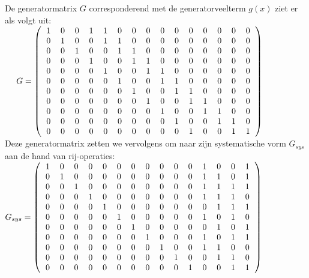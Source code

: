 \documentclass[11pt,a4paper]{article}
\begin{document}
De generatormatrix $G$ corresponderend met de generatorveelterm $g(x)$ ziet er als volgt uit:\\

$~~~~G=\left(
\begin{tabular}{ccccccccccccccc}
1 & 0 & 0 & 1 & 1 & 0 & 0 & 0 & 0 & 0 & 0 & 0 & 0 & 0 & 0\\
0 & 1 & 0 & 0 & 1 & 1 & 0 & 0 & 0 & 0 & 0 & 0 & 0 & 0 & 0\\
0 & 0 & 1 & 0 & 0 & 1 & 1 & 0 & 0 & 0 & 0 & 0 & 0 & 0 & 0\\
0 & 0 & 0 & 1 & 0 & 0 & 1 & 1 & 0 & 0 & 0 & 0 & 0 & 0 & 0\\
0 & 0 & 0 & 0 & 1 & 0 & 0 & 1 & 1 & 0 & 0 & 0 & 0 & 0 & 0\\
0 & 0 & 0 & 0 & 0 & 1 & 0 & 0 & 1 & 1 & 0 & 0 & 0 & 0 & 0\\
0 & 0 & 0 & 0 & 0 & 0 & 1 & 0 & 0 & 1 & 1 & 0 & 0 & 0 & 0\\	
0 & 0 & 0 & 0 & 0 & 0 & 0 & 1 & 0 & 0 & 1 & 1 & 0 & 0 & 0\\ 
0 & 0 & 0 & 0 & 0 & 0 & 0 & 0 & 1 & 0 & 0 & 1 & 1 & 0 & 0\\ 
0 & 0 & 0 & 0 & 0 & 0 & 0 & 0 & 0 & 1 & 0 & 0 & 1 & 1 & 0\\
0 & 0 & 0 & 0 & 0 & 0 & 0 & 0 & 0 & 0 & 1 & 0 & 0 & 1 & 1 
\end{tabular}
\right)$\\

Deze generatormatrix zetten we vervolgens om naar zijn systematische vorm $G_{sys}$ aan de hand van rij-operaties:\\

$G_{sys} =\left(
\begin{tabular}{ccccccccccccccc}
1 & 0 & 0 & 0 & 0 & 0 & 0 & 0 & 0 & 0 & 0 & 1 & 0 & 0 & 1\\
0 & 1 & 0 & 0 & 0 & 0 & 0 & 0 & 0 & 0 & 0 & 1 & 1 & 0 & 1\\
0 & 0 & 1 & 0 & 0 & 0 & 0 & 0 & 0 & 0 & 0 & 1 & 1 & 1 & 1\\
0 & 0 & 0 & 1 & 0 & 0 & 0 & 0 & 0 & 0 & 0 & 1 & 1 & 1 & 0\\
0 & 0 & 0 & 0 & 1 & 0 & 0 & 0 & 0 & 0 & 0 & 0 & 1 & 1 & 1\\
0 & 0 & 0 & 0 & 0 & 1 & 0 & 0 & 0 & 0 & 0 & 1 & 0 & 1 & 0\\
0 & 0 & 0 & 0 & 0 & 0 & 1 & 0 & 0 & 0 & 0 & 0 & 1 & 0 & 1\\
0 & 0 & 0 & 0 & 0 & 0 & 0 & 1 & 0 & 0 & 0 & 1 & 0 & 1 & 1\\
0 & 0 & 0 & 0 & 0 & 0 & 0 & 0 & 1 & 0 & 0 & 1 & 1 & 0 & 0\\ 
0 & 0 & 0 & 0 & 0 & 0 & 0 & 0 & 0 & 1 & 0 & 0 & 1 & 1 & 0\\
0 & 0 & 0 & 0 & 0 & 0 & 0 & 0 & 0 & 0 & 1 & 0 & 0 & 1 & 1
\end{tabular}
\right)$\\
\end{document}
